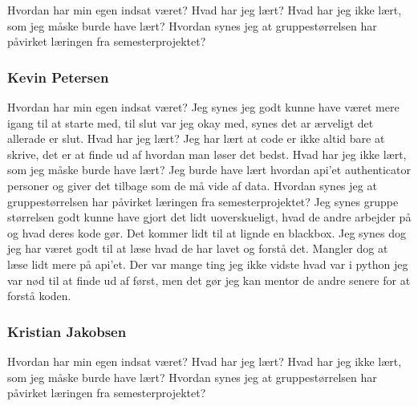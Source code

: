 Hvordan har min egen indsat været?
Hvad har jeg lært?
Hvad har jeg ikke lært, som jeg måske burde have lært?
Hvordan synes jeg at gruppestørrelsen har påvirket læringen fra semesterprojektet?

\subsubsection{Kevin Petersen}
Hvordan har min egen indsat været?
Jeg synes jeg godt kunne have været mere igang til at starte med, til slut var jeg okay med, synes det ar ærveligt det allerade er slut.
Hvad har jeg lært?
Jeg har lært at code er ikke altid bare at skrive, det er at finde ud af hvordan man løser det bedst.
Hvad har jeg ikke lært, som jeg måske burde have lært?
Jeg burde have lært hvordan api'et authenticator personer og giver det tilbage som de må vide af data.
Hvordan synes jeg at gruppestørrelsen har påvirket læringen fra semesterprojektet?
Jeg synes gruppe størrelsen godt kunne have gjort det lidt uoverskueligt, hvad de andre arbejder på og hvad deres kode gør.
Det kommer lidt til at lignde en blackbox.
Jeg synes dog jeg har været godt til at læse hvad de har lavet og forstå det. Mangler dog at læse lidt mere på api'et.
Der var mange ting jeg ikke vidste hvad var i python jeg var nød til at finde ud af først, men det gør jeg kan mentor de andre senere for at forstå koden.

\subsubsection{Kristian Jakobsen}
Hvordan har min egen indsat været?
Hvad har jeg lært?
Hvad har jeg ikke lært, som jeg måske burde have lært?
Hvordan synes jeg at gruppestørrelsen har påvirket læringen fra semesterprojektet?

